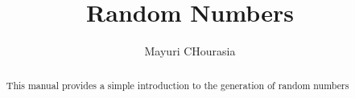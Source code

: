 \documentclass[journal,12pt,twocolumn]{IEEEtran}
\renewcommand\thesection{\arabic{section}}
\begin{document}
\let\StandardTheFigure\thefigure
\renewcommand{\thefigure}{\thesection}



\makeatletter
{}
\makeatother

\let\StandardTheFigure\thefigure
\let\StandardTheTable\thetable
\let\vec\mathbf
{}

\vspace{3cm}


\title{%
	Random Numbers
}

%
%
%

\author{Mayuri CHourasia}
\maketitle

\tableofcontents

\bigskip

\renewcommand{\thefigure}{\theenumi}
\renewcommand{\thetable}{\theenumi}

\begin{abstract}
This manual provides a simple introduction to the generation of random numbers
\end{abstract}
\end{document}
